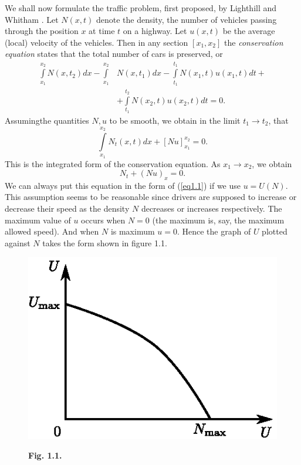 We shall now formulate the traffic problem, first proposed, by\break
Lighthill and Whitham \cite{key26}. Let $N(x,t)$ denote the density,
the number of vehicles passing through the position $x$ at time $t$ on
a highway. Let $u(x,t)$ be the average (local) velocity of the
vehicles. Then in any section $[x_1, x_2]$ the {\em conservation
  equation} states that the total number of cars is preserved, or  
\begin{align*}
\int\limits^{x_2}_{x_1} N(x,t_2) dx - \int\limits^{x_2}_{x_1} &
N(x,t_1) dx - \int\limits^{t_1}_{t_1} N(x_1, t) u (x_1, t) dt + \\ 
& + \int\limits^{t_2}_{t_1} N(x_2, t) u(x_2, t) dt =0.
\end{align*}
Assuming\pageoriginale the quantities $N,u$ to be smooth, we obtain in
the limit $t_1 \to t_2$, that 
$$ 
\int\limits^{x_2}_{x_1} N_t (x,t) dx + [Nu]^{x_2}_{x_1} = 0. 
$$
This is the integrated form of the conservation equation. As $x_1 \to x_2$, we obtain
\begin{equation*}
N_t + (Nu)_x = 0. \tag{1.2}\label{eq1.2}
\end{equation*}
We can always put this equation in the form of (\ref{eq1.1}) if we use
$u = U(N)$. This assumption seems to be reasonable since drivers are
supposed to increase or decrease their speed as the density $N$
decreases or increases respectively. The maximum value of $u$ occurs
when $N=0$ (the maximum is, say, the maximum allowed speed). And when
$N$ is maximum $u=0$. Hence the graph of $U$ plotted against $N$ takes
the form shown in figure 1.1. 
\begin{figure}[H]
\centering
\includegraphics{figures/fig1.1.eps}
\centerline{\bf Fig. 1.1.}
\end{figure}
